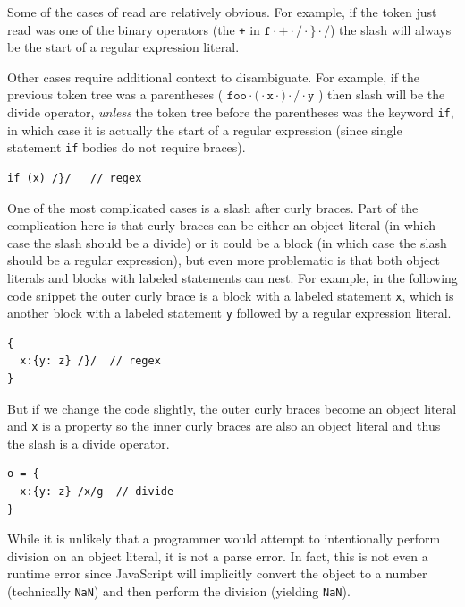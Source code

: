 \documentclass[preprint,10pt]{sigplanconf}
\begin{document}
Some of the cases of read are relatively obvious. For example, if the
token just read was one of the binary operators (\eg the \texttt{+} in
\(\texttt{f} \cdot \texttt{+} \cdot \texttt{/} 
\cdot \texttt{\}} \cdot \texttt{/}
\)) the slash will always be the start of a regular expression
literal. 

Other cases require additional context to disambiguate. For example,
if the previous token tree was a parentheses (\eg 
\(
\texttt{foo} \cdot \texttt{(} \cdot \texttt{x} \cdot \texttt{)} \cdot \texttt{/} \cdot \texttt{y}
\)
) then slash will be the divide
operator, \emph{unless} the token tree before the parentheses was the
keyword \texttt{if}, in which case it is actually the start of a
regular expression (since single statement \texttt{if} bodies do not require
braces).

\begin{lstlisting}
if (x) /}/   // regex
\end{lstlisting}

One of the most complicated cases is a slash after curly braces.
Part of the  complication here is that curly braces can be either an object
literal (in which case the slash should be a divide) or it could be a
block (in which case the slash should be a regular expression), but
even more problematic is that both object literals and blocks with
labeled statements can nest. For example, in the following code snippet
the outer curly brace is a block with a labeled statement
\verb!x!, which is another block with a labeled statement
\verb!y! followed by a regular expression literal.
\begin{lstlisting}
{
  x:{y: z} /}/  // regex
}
\end{lstlisting}

But if we change the code slightly, the outer curly braces become an
object literal and \verb!x! is a property so the inner curly
braces are also an object literal and thus the slash is a divide operator.

\begin{lstlisting}
o = {
  x:{y: z} /x/g  // divide
}
\end{lstlisting}

While it is unlikely that a programmer would attempt to intentionally
perform division on an object literal, it is not a parse error. In
fact, this is not even a runtime error since JavaScript will
implicitly convert the object to a number (technically
\verb!NaN!) and then perform the division (yielding
\verb!NaN!).
\end{document}

